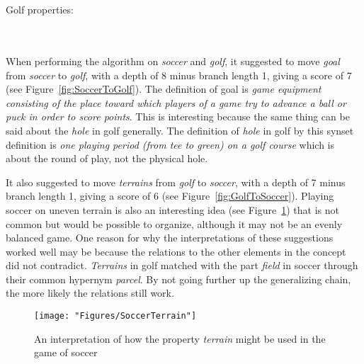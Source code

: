 \noindent{}
\\\\Golf properties:
	
\noindent{}
\\\\When performing the algorithm on \emph{soccer} and \emph{golf}, it suggested to move \emph{goal} from \emph{soccer} to \emph{golf}, with a depth of 8 minus branch length 1, giving a score of 7 (see Figure~\ref{fig:SoccerToGolf}). The definition of goal is \emph{game equipment consisting of the place toward which players of a game try to advance a ball or puck in order to score points}. This is interesting because the same thing can be said about the \emph{hole} in golf generally. The definition of \emph{hole} in golf by this synset definition is \emph{one playing period (from tee to green) on a golf course} which is about the round of play, not the physical hole.


It also suggested to move \emph{terrains} from \emph{golf} to \emph{soccer}, with a depth of 7 minus branch length 1, giving a score of 6 (see Figure~\ref{fig:GolfToSoccer}).
Playing soccer on uneven terrain is also an interesting idea (see Figure~\ref{fig:SoccerTerrain}) that is not common but would be possible to organize, although it may not be an evenly balanced game. One reason for why the interpretations of these suggestions worked well may be because the relations to the other elements in the concept did not contradict. \emph{Terrains} in golf matched with the part \emph{field} in soccer through their common hypernym \emph{parcel}. By not going further up the generalizing chain, the more likely the relations still work.

\begin{figure} \centering \texttt{[image: "Figures/SoccerTerrain"]} \caption{An interpretation of how the property \emph{terrain} might be used in the game of soccer} \label{fig:SoccerTerrain} \end{figure}

